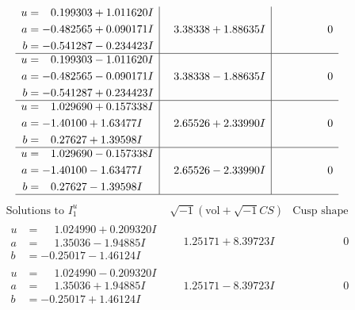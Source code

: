\documentclass[1p]{elsarticle_modified}
\theoremstyle{definition}
\newcommand{\I}{\sqrt{-1}}
\begin{document}
$$\begin{array}{c|c|c}
\begin{aligned}
u &= \phantom{-}0.199303 + 1.011620 I \\
a &= -0.482565 + 0.090171 I \\
b &= -0.541287 - 0.234423 I\end{aligned}
 & \phantom{-}3.38338 + 1.88635 I & \phantom{-0.000000 } 0 \\ \hline\begin{aligned}
u &= \phantom{-}0.199303 - 1.011620 I \\
a &= -0.482565 - 0.090171 I \\
b &= -0.541287 + 0.234423 I\end{aligned}
 & \phantom{-}3.38338 - 1.88635 I & \phantom{-0.000000 } 0 \\ \hline\begin{aligned}
u &= \phantom{-}1.029690 + 0.157338 I \\
a &= -1.40100 + 1.63477 I \\
b &= \phantom{-}0.27627 + 1.39598 I\end{aligned}
 & \phantom{-}2.65526 + 2.33990 I & \phantom{-0.000000 } 0 \\ \hline\begin{aligned}
u &= \phantom{-}1.029690 - 0.157338 I \\
a &= -1.40100 - 1.63477 I \\
b &= \phantom{-}0.27627 - 1.39598 I\end{aligned}
 & \phantom{-}2.65526 - 2.33990 I & \phantom{-0.000000 } 0\\
 \hline 
 \end{array}$$\newpage$$\begin{array}{c|c|c}  
\text{Solutions to }I^u_{1}& \I (\text{vol} + \sqrt{-1}CS) & \text{Cusp shape}\\
 \hline 
\begin{aligned}
u &= \phantom{-}1.024990 + 0.209320 I \\
a &= \phantom{-}1.35036 - 1.94885 I \\
b &= -0.25017 - 1.46124 I\end{aligned}
 & \phantom{-}1.25171 + 8.39723 I & \phantom{-0.000000 } 0 \\ \hline\begin{aligned}
u &= \phantom{-}1.024990 - 0.209320 I \\
a &= \phantom{-}1.35036 + 1.94885 I \\
b &= -0.25017 + 1.46124 I\end{aligned}
 & \phantom{-}1.25171 - 8.39723 I & \phantom{-0.000000 } 0 \\ \hline\begin{aligned}

\end{aligned}
\end{array}$$
\end{document}

